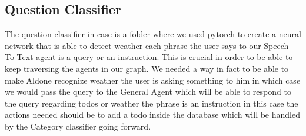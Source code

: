 \documentclass{article}
\begin{document}
\subsection*{\color{draculayellow}Question Classifier}
The question classifier in case is a folder where we used pytorch to create a neural network that is able to detect weather each phrase the user says to our Speech-To-Text agent is a query or an instruction. This is crucial in order to be able to keep traversing the agents in our graph. We needed a way in fact to be able to make Aldone recognize weather the user is asking something to him in which case we would pass the query to the General Agent which will be able to respond to the query regarding todos or weather the phrase is an instruction in this case the actions needed should be to add a todo inside the database which will be handled by the Category classifier going forward.
\end{document}
